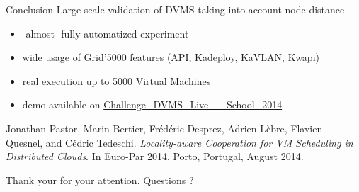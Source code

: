 \documentclass{beamer}
\begin{document}
\begin{frame}{Conclusion}
Large scale validation of DVMS taking into account node distance
\begin{itemize}
    \item -almost- fully automatized experiment
    \item wide usage of Grid'5000 features (API, Kadeploy, KaVLAN, Kwapi)
    \item real execution up to 5000 Virtual Machines
    \item demo available on \href{https://www.grid5000.fr/mediawiki/index.php/Challenge_DVMS_Live_-_School_2014}
    {Challenge\_DVMS\_Live\_-\_School\_2014}
\end{itemize}

\begin{block}{}
\small
Jonathan Pastor, Marin Bertier, Frédéric Desprez, Adrien Lèbre, Flavien Quesnel, 
and Cédric Tedeschi. \textit{Locality-aware Cooperation for VM Scheduling in 
Distributed Clouds}. In Euro-Par 2014, Porto, Portugal, August 2014.
\end{block}
\end{frame}

\begin{frame}
Thank your for your attention. Questions ?
\end{frame}
\end{document}
